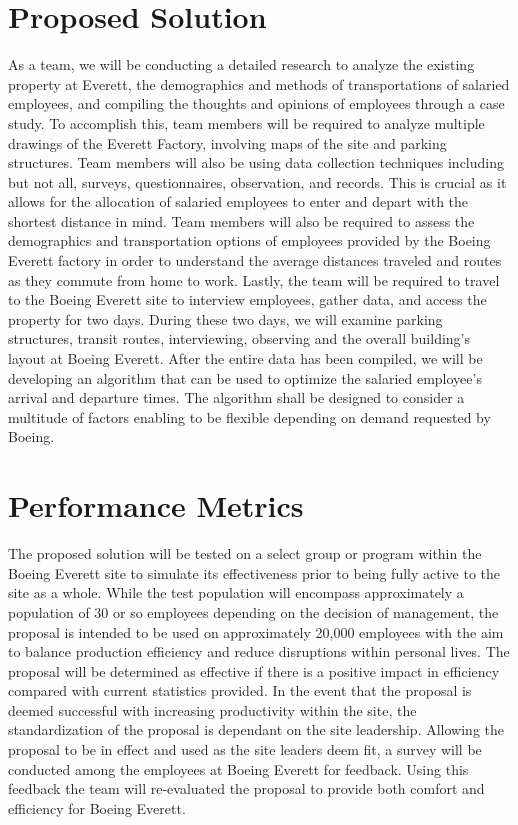 \documentclass[journal, 11pt, letterpaper]{IEEEtran}
\newcommand\tab[1][1cm]{\hspace*{#1}}
\begin{document}
\section{Proposed Solution}


\tab As a team, we will be conducting a detailed research to analyze the existing property at Everett, the demographics and methods of transportations of salaried employees, and compiling the thoughts and opinions of employees through a case study.
To accomplish this, team members will be required to analyze multiple drawings of the Everett Factory, involving maps of the site and parking structures. Team members will also be using data collection techniques including but not all, surveys, questionnaires, observation, and records.  
This is crucial as it allows for the allocation of salaried employees to enter and depart with the shortest distance in mind.
Team members will also be required to assess the demographics and transportation options of employees provided by the Boeing Everett factory in order to understand the average distances traveled and routes as they commute from home to work.
Lastly, the team will be required to travel to the Boeing Everett site to interview employees, gather data, and access the property for two days. 
During these two days, we will examine parking structures, transit routes, interviewing, observing and the overall building's layout at Boeing Everett. 
After the entire data has been compiled, we will be developing an algorithm that can be used to optimize the salaried employee’s arrival and departure times.
The algorithm shall be designed to consider a multitude of factors enabling to be flexible depending on demand requested by Boeing.




\section{Performance Metrics}
\tab The proposed solution will be tested on a select group or program within the Boeing Everett site to simulate its effectiveness prior to being fully active to the site as a whole. 
While the test population will encompass approximately a population of 30 or so employees depending on the decision of management, the proposal is intended to be used on approximately 20,000 employees with the aim to balance production efficiency and reduce disruptions within personal lives. 
The proposal will be determined as effective if there is a positive impact in efficiency compared with current statistics provided. 
In the event that the proposal is deemed successful with increasing productivity within the site, the standardization of the proposal is dependant on the site leadership. 
Allowing the proposal to be in effect and used as the site leaders deem fit, a survey will be conducted among the employees at Boeing Everett for feedback. 
Using this feedback the team will re-evaluated the proposal to provide both comfort and efficiency for Boeing Everett.    
\end{document}
